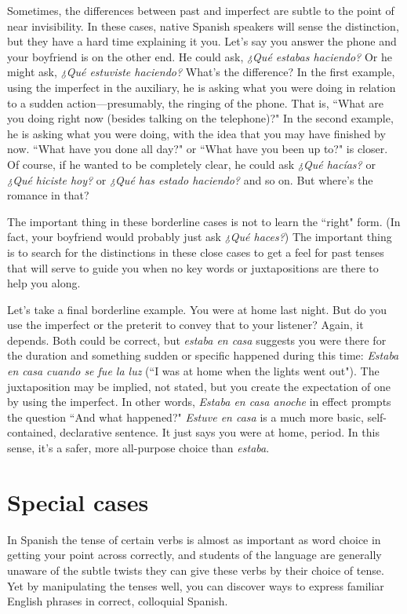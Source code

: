 Sometimes, the differences between past and imperfect are
subtle to the point of near invisibility. In these cases, native Spanish
speakers will sense the distinction, but they have a hard time explaining it you. Let's say you answer the phone and your boyfriend is on the
other end. He could ask, \emph{¿Qué estabas haciendo?} Or he might ask,
\emph{¿Qué estuviste haciendo?} What's the difference? In the first example,
using the imperfect in the auxiliary, he is asking what you were doing
in relation to a sudden action---presumably, the ringing of the phone.
That is, ``What are you doing right now (besides talking on the telephone)?" In the second example, he is asking what you were doing,
with the idea that you may have finished by now. ``What have you
done all day?" or ``What have you been up to?" is closer. Of course, if
he wanted to be completely clear, he could ask \emph{¿Qué hacías?} or \emph{¿Qué
hiciste hoy?} or \emph{¿Qué has estado haciendo?} and so on. But where's the
romance in that?

The important thing in these borderline cases is not to learn
the ``right" form. (In fact, your boyfriend would probably just ask \emph{¿Qué
haces?}) The important thing is to search for the distinctions in these
close cases to get a feel for past tenses that will serve to guide you
when no key words or juxtapositions are there to help you along.

Let's take a final borderline example. You were at home last
night. But do you use the imperfect or the preterit to convey that to
your listener? Again, it depends. Both could be correct, but \emph{estaba en
casa} suggests you were there for the duration and something sudden or
specific happened during this time: \emph{Estaba en casa cuando se fue la
luz} (``I was at home when the lights went out"). The juxtaposition may
be implied, not stated, but you create the expectation of one by using
the imperfect. In other words, \emph{Estaba en casa anoche} in effect prompts
the question ``And what happened?" \emph{Estuve en casa} is a much more
basic, self-contained, declarative sentence. It just says you were at
home, period. In this sense, it's a safer, more all-purpose choice than
\emph{estaba}.

\section{Special cases}

In Spanish the tense of certain verbs is almost as important as
word choice in getting your point across correctly, and students of the
language are generally unaware of the subtle twists they can give these
verbs by their choice of tense. Yet by manipulating the tenses well,
you can discover ways to express familiar English phrases in correct,
colloquial Spanish.

